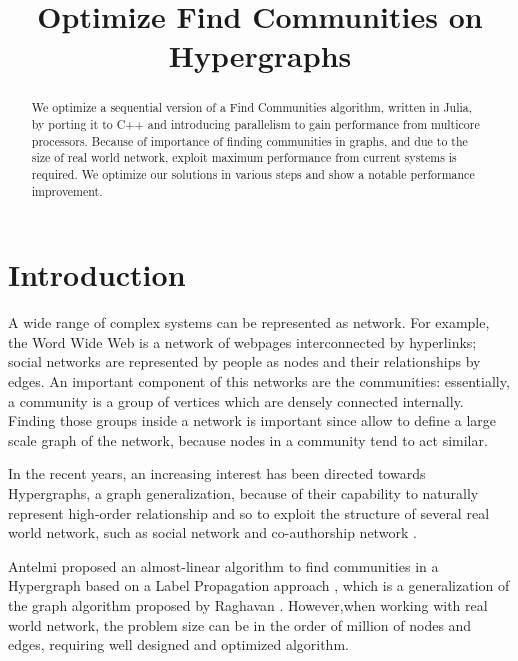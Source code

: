 \documentclass[conference]{IEEEtran}
\newcommand{\mypar}[1]{{\bf #1.}}
\begin{document}
\title{Optimize Find Communities on Hypergraphs}


\author{
}

\maketitle

\begin{abstract}
We optimize a sequential version of a Find Communities algorithm, written in Julia, by porting it to C++ and introducing parallelism to gain performance from multicore processors. Because of importance of finding communities in graphs, and due to the size of real world network, exploit maximum performance from current systems is required.
We optimize our solutions in various steps and show a notable performance improvement.
\end{abstract}

\section{Introduction}\label{sec:intro}

A wide range of complex systems can be represented as network. For example, the Word Wide Web is a network of webpages interconnected by hyperlinks; social networks are represented by people as nodes and their relationships by edges. An important component of this networks are the communities: essentially, a community is a group of vertices which are densely connected internally. Finding those groups inside a network is important since allow to define a large scale graph of the network, because nodes in a community tend to act similar.\cite{find_community_eigenvectors}

In the recent years, an increasing interest has been directed towards Hypergraphs, a graph generalization, because of their capability to naturally represent high-order relationship and so to exploit the structure of several real world network, such as social network and co-authorship network \cite{Hg_introduction}.

Antelmi proposed an almost-linear algorithm to find communities in a Hypergraph based on a Label Propagation approach \cite{SimpleHypergraphs}, which is a generalization of the graph algorithm proposed by Raghavan \cite{LP_standard}. However,when working with real world network, the problem size can be in the order of million of nodes and edges, requiring well designed and optimized algorithm.
\end{document}
